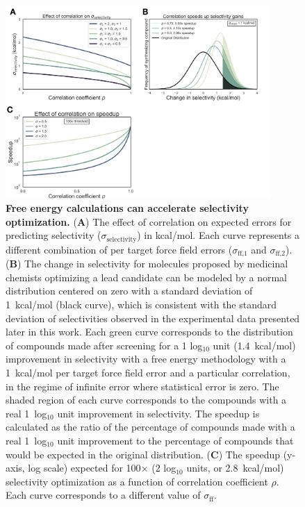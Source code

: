 \documentclass[phd,tocprelim]{cornell}
\begin{document}
\begin{landscape}
\begin{figure}[p]
\centering
  \includegraphics[width=0.9\textwidth]{figures/figure1.png}
  \caption[Free energy calculations can accelerate selectivity optimization.]{{\bf Free energy calculations can accelerate selectivity optimization.}
  ({\bf A})  The effect of correlation on expected errors for predicting selectivity ($\sigma_\text{selectivity}$) in kcal/mol. Each curve represents a different combination of per target force field errors ($\sigma_\text{ff,1}$ and $\sigma_\text{ff,2}$). 
  ({\bf B}) The change in selectivity for molecules proposed by medicinal chemists optimizing a lead candidate can be modeled by a normal distribution centered on zero with a standard deviation of 1~kcal/mol (black curve), which is consistent with the standard deviation of selectivities observed in the experimental data presented later in this work. 
  Each green curve corresponds to the distribution of compounds made after screening for a 1 log$_{10}$ unit (1.4~kcal/mol) improvement in selectivity with a free energy methodology with a 1~kcal/mol per target force field error and a particular correlation, in the regime of infinite error where statistical error is zero. 
  The shaded region of each curve corresponds to the compounds with a real 1~log$_{10}$ unit improvement in selectivity. 
  The speedup is calculated as the ratio of the percentage of compounds made with a real 1~log$_{10}$ unit improvement to the percentage of compounds that would be expected in the original distribution.  
  ({\bf C}) The speedup (y-axis, log scale) expected for 100$\times$ (2 log$_{10}$ units, or 2.8~kcal/mol) selectivity optimization as a function of correlation coefficient $\rho$. 
  Each curve corresponds to a different value of $\sigma_\text{ff}$.  
}
 \label{fig:figure-1}
\end{figure}
\end{landscape}
\end{document}
